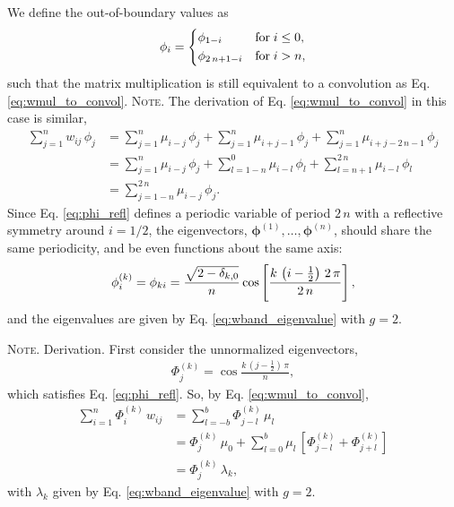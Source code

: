 \documentclass[preprint, superscriptaddress, floatfix]{revtex4-1}
\newcommand{\note}[1]{{\color{DarkGreen}\footnotesize \textsc{Note.} #1}}
\begin{document}
We define the out-of-boundary values as
%
\begin{equation}
  \phi_i
  =
  \begin{dcases}
    \phi_{ 1 - i }           & \mathrm{for \;} i \le 0, \\
    \phi_{ 2 \, n + 1 - i }  & \mathrm{for \;} i > n,
  \end{dcases}
\label{eq:phi_refl}
\end{equation}
%
such that the matrix multiplication is still equivalent to
a convolution as Eq. \eqref{eq:wmul_to_convol}.
%
\note{The derivation of Eq. \eqref{eq:wmul_to_convol}
  in this case is similar,
  \begin{align*}
    \sum_{j = 1}^n w_{ij} \, \phi_j
    &=
    \sum_{j = 1}^n
      \mu_{i - j} \, \phi_j
    +
    \sum_{j = 1}^n
      \mu_{i + j - 1} \, \phi_j
    +
    \sum_{j = 1}^n
      \mu_{i + j - 2 \, n - 1} \, \phi_j
    \\
    &=
    \sum_{j = 1}^n
      \mu_{i - j} \, \phi_j
    +
    \sum_{l = 1 - n}^0
      \mu_{i - l} \, \phi_l
    +
    \sum_{l = n + 1}^{ 2 \, n }
      \mu_{i - l} \, \phi_l
    \\
    &=
    \sum_{j = 1 - n}^{ 2 \, n}
      \mu_{i - j} \, \phi_j.
  \end{align*}
}%
%
Since Eq. \eqref{eq:phi_refl}
defines a periodic variable of period $2 \, n$
with a reflective symmetry around $i = 1/2$,
the eigenvectors,
$\pmb\phi^{(1)}, \dots, \pmb\phi^{(n)}$,
should share the same periodicity,
and be even functions about the same axis:
%
\begin{equation}
  \phi^{(k)}_i
  =
  \phi_{k i}
  =
  \frac{ \sqrt{ 2 - \delta_{k, 0} } }
       {             n              }
  \cos \left[
       \frac{ k \, \left( i - \frac 1 2 \right) \, 2 \, \pi}
            {             2 \, n                           }
       \right]
  ,
\notag
\end{equation}
%
and the eigenvalues are given by
  Eq. \eqref{eq:wband_eigenvalue}
  with $g = 2$.

\note{Derivation.
  First consider the unnormalized eigenvectors,
  \begin{align*}
  \Phi^{(k)}_j
  =
  \cos \frac{ k \, \left( j - \frac 1 2 \right) \, \pi }{n},
  \end{align*}
  which satisfies Eq. \eqref{eq:phi_refl}.
  So, by Eq. \eqref{eq:wmul_to_convol},
  \begin{align*}
  \sum_{i = 1}^n
    \Phi^{(k)}_i \, w_{ij}
  &=
  \sum_{l = -b}^b
    \Phi^{(k)}_{j - l} \, \mu_l
  \\
  &=
    \Phi^{(k)}_j \, \mu_0
  + \sum_{l=0}^{b}
    \mu_l \,
    \left[
      \Phi^{(k)}_{j-l}
      +
      \Phi^{(k)}_{j+l}
    \right]
  \\
  &= \Phi^{(k)}_j \, \lambda_k,
  \end{align*}
  with $\lambda_k$ given by Eq. \eqref{eq:wband_eigenvalue}
  with $g = 2$.
}%
%
\end{document}
